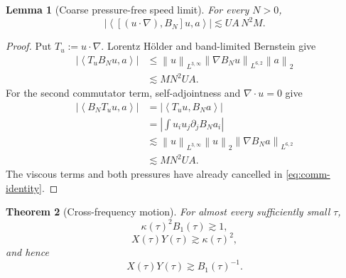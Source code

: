 \documentclass[11pt]{article}
\newtheorem{theorem}{Theorem}
\newtheorem{lemma}[theorem]{Lemma}
\theoremstyle{remark}
\newcommand{\norm}[1]{\left\|#1\right\|}
\newcommand{\ip}[2]{\left\langle#1,#2\right\rangle}
\begin{document}
\begin{lemma}[Coarse pressure-free speed limit]
\label{lem:coarse-speed}
For every \(N>0\),
\begin{equation}
\label{eq:coarse-speed}
 \left|
 \ip{[(u\cdot\nabla),B_N]u}{a}
 \right|
 \lesssim
 UA\,N^2M.
\end{equation}
\end{lemma}

\begin{proof}
Put \(T_u:=u\cdot\nabla\).  Lorentz H\"older and band-limited
Bernstein give
\[
 \begin{aligned}
 |\ip{T_uB_Nu}{a}|
 &\leq
 \norm{u}_{L^{3,\infty}}
 \norm{\nabla B_Nu}_{L^{6,2}}
 \norm{a}_2\\
 &\lesssim
 M N^2UA.
 \end{aligned}
\]
For the second commutator term, self-adjointness and
\(\nabla\cdot u=0\) give
\[
 \begin{aligned}
 |\ip{B_NT_uu}{a}|
 &=
 |\ip{T_uu}{B_Na}|\\
 &=
 \left|
 \int u_i u_j\partial_jB_Na_i
 \right|\\
 &\lesssim
 \norm{u}_{L^{3,\infty}}\norm{u}_2
 \norm{\nabla B_Na}_{L^{6,2}}\\
 &\lesssim
 M N^2UA.
 \end{aligned}
\]
The viscous terms and both pressures have already cancelled in
\eqref{eq:comm-identity}.
\end{proof}

\begin{theorem}[Cross-frequency motion]
\label{thm:cross-motion}
For almost every sufficiently small \(\tau\),
\begin{equation}
\label{eq:kappa-B1}
 \boxed{
 \kappa(\tau)^2B_1(\tau)\gtrsim1,
 }
\end{equation}
\begin{equation}
\label{eq:XY-kappa}
 \boxed{
 X(\tau)Y(\tau)\gtrsim\kappa(\tau)^2,
 }
\end{equation}
and hence
\begin{equation}
\label{eq:XY-B1}
 \boxed{
 X(\tau)Y(\tau)\gtrsim B_1(\tau)^{-1}.
 }
\end{equation}
\end{theorem}
\end{document}
